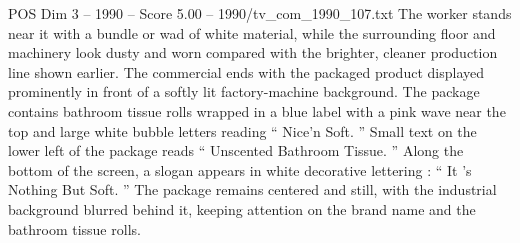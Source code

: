 \begin{textsample}{POS Dim 3 – 1990 – Score 5.00 – 1990/tv\_com\_1990\_107.txt}
The worker stands near it with a bundle or wad of white material, while the surrounding floor and machinery look dusty and worn compared with the brighter, cleaner production line shown earlier.
The commercial ends with the packaged product displayed prominently in front of a softly lit factory-machine background.
The package contains bathroom tissue rolls wrapped in a blue label with a pink wave near the top and large white bubble letters reading “ Nice’n Soft. ” Small text on the lower left of the package reads “ Unscented Bathroom Tissue. ” Along the bottom of the screen, a slogan appears in white decorative lettering : “ It ’s Nothing But Soft. ” The package remains centered and still, with the industrial background blurred behind it, keeping attention on the brand name and the bathroom tissue rolls.

\end{textsample}
